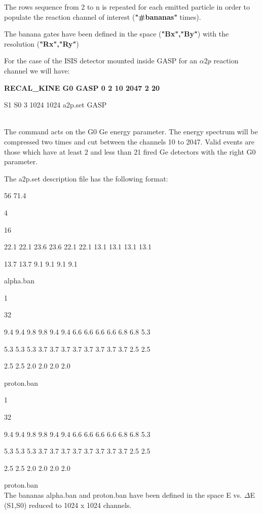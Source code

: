 \begin{itemize}
	The rows sequence from 2 to n is repeated for each emitted particle in
	order to populate the reaction channel of interest ({\bf "\#bananas"}
	times).

	The banana gates have been defined in the space ({\bf "Bx","By"}) with
	the resolution ({\bf "Rx","Ry"})

	For the case of the ISIS detector mounted inside GASP for an $\alpha
	2p$ reaction channel we will have:

	\hskip1cm{\bf RECAL\_KINE G0 GASP 0 2 10 2047 2 20

	\hskip1.5cm S1 S0 3 1024 1024 a2p.set GASP }\\
	The command acts on the G0 Ge energy parameter. The energy spectrum
	will be compressed two times and cut between the channels 10 to 2047.
	Valid events are those which have at least 2 and less than 21 fired Ge
	detectors with the right G0 parameter.

	The a2p.set description file has the following format:

	\hskip1cm 56 71.4 						

	\hskip1cm 4 							

	\hskip1cm 16 							

	\hskip1cm 22.1 22.1 23.6 23.6 22.1 22.1 13.1 13.1 13.1 13.1 	

	\hskip1cm 13.7 13.7  9.1  9.1  9.1  9.1				

	\hskip1cm alpha.ban						

	\hskip1cm   1							

	\hskip1cm  32							

	\hskip1cm 9.4 9.4 9.8 9.8 9.4 9.4 6.6 6.6 6.6 6.6 6.8 6.8 5.3 	

	\hskip1cm 5.3 5.3 5.3 3.7 3.7 3.7 3.7 3.7 3.7 3.7 3.7 2.5 2.5 	

	\hskip1cm 2.5 2.5 2.0 2.0 2.0 2.0				

	\hskip1cm proton.ban						

	\hskip1cm   1							

	\hskip1cm  32							

	\hskip1cm 9.4 9.4 9.8 9.8 9.4 9.4 6.6 6.6 6.6 6.6 6.8 6.8 5.3 	

	\hskip1cm 5.3 5.3 5.3 3.7 3.7 3.7 3.7 3.7 3.7 3.7 3.7 2.5 2.5 	

	\hskip1cm 2.5 2.5 2.0 2.0 2.0 2.0				

	\hskip1cm proton.ban						\\

	The bananas alpha.ban and proton.ban have been defined in the space 
	E vs. $\Delta$E (S1,S0) reduced to 1024 x 1024 channels.  	


\end{itemize}

